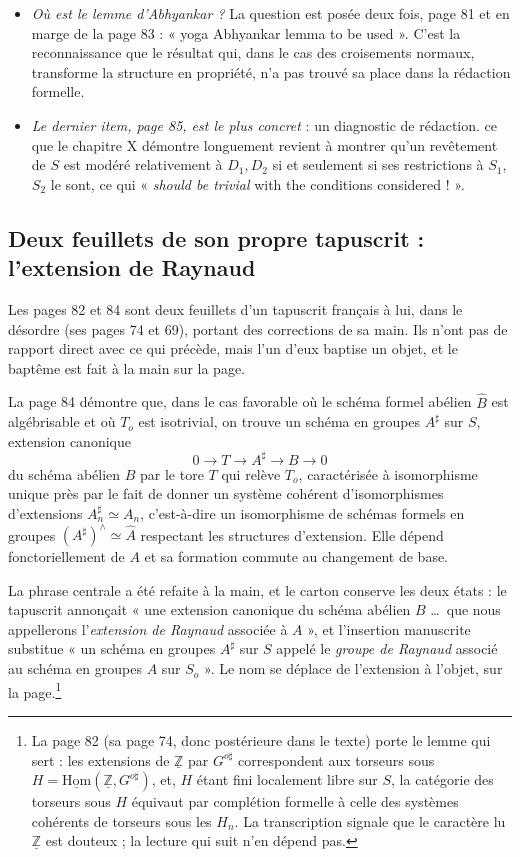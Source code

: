 \documentclass[11pt,a4paper]{article}
\begin{document}
\begin{itemize}
    (page 79 : la normalité n'est peut-être pas stable par localisation étale).
  \item \emph{Où est le lemme d'Abhyankar ?} La question est posée deux fois,
    page 81 et en marge de la page 83 : « yoga Abhyankar lemma to be used ».
    C'est la reconnaissance que le résultat qui, dans le cas des croisements
    normaux, transforme la structure en propriété, n'a pas trouvé sa place dans
    la rédaction formelle.
  \item \emph{Le dernier item, page 85, est le plus concret} : un
    diagnostic de rédaction. ce que le chapitre X démontre longuement revient
    à montrer qu'un revêtement de $S$ est modéré relativement à $D_{1}, D_{2}$
    si et seulement si ses restrictions à $S_{1}$, $S_{2}$ le sont,
    ce qui « \emph{should be trivial} with the conditions considered ! ».
\end{itemize}

\subsection*{Deux feuillets de son propre tapuscrit : l'extension de Raynaud}

Les pages 82 et 84 sont deux feuillets d'un tapuscrit français à lui, dans le
désordre (ses pages 74 et 69), portant des corrections de sa main. Ils
n'ont pas de rapport direct avec ce qui précède, mais l'un d'eux baptise un
objet, et le baptême est fait à la main sur la page.

La page 84 démontre que, dans le cas favorable où le schéma formel abélien
$\hat{B}$ est algébrisable et où $T_{o}$ est isotrivial, on trouve un schéma en
groupes $A^{\sharp}$ sur $S$, extension canonique
\[
  0 \longrightarrow T \longrightarrow A^{\sharp} \longrightarrow B
  \longrightarrow 0
\]
du schéma abélien $B$ par le tore $T$ qui relève $T_{o}$, caractérisée à
isomorphisme unique près par le fait de donner un système cohérent
d'isomorphismes d'extensions $A^{\sharp}_{n} \simeq A_{n}$, c'est-à-dire un
isomorphisme de schémas formels en groupes
$(A^{\sharp})^{\wedge} \simeq \hat{A}$ respectant les structures d'extension.
Elle dépend fonctoriellement de $A$ et sa formation commute au changement de
base.

La phrase centrale a été refaite à la main, et le carton conserve les deux
états : le tapuscrit annonçait « une extension canonique du schéma abélien $B$
…\ que nous appellerons l'\emph{extension de Raynaud} associée à $A$ », et
l'insertion manuscrite substitue « un schéma en groupes $A^{\sharp}$ sur $S$
appelé le \emph{groupe de Raynaud} associé au schéma en groupes $A$ sur
$S_{o}$ ». Le nom se déplace de l'extension à l'objet, sur la
page.\footnote{La page 82 (sa page 74, donc postérieure dans le texte)
porte le lemme qui sert : les extensions de $\underline{\mathbb{Z}}$ par
$G^{o\sharp}$ correspondent aux torseurs sous
$H = \underline{\mathrm{Hom}}(\underline{\mathbb{Z}}, G^{o\sharp})$, et,
$H$ étant fini localement libre sur $S$, la catégorie des torseurs sous $H$
équivaut par complétion formelle à celle des systèmes cohérents de torseurs
sous les $H_{n}$. La transcription signale que le caractère lu
$\underline{\mathbb{Z}}$ est douteux ; la lecture qui suit n'en dépend pas.}
\end{document}

